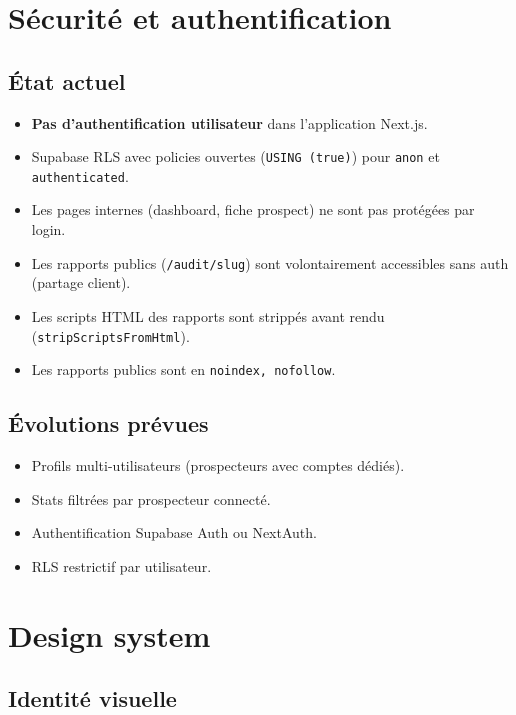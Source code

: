 \documentclass[11pt,a4paper]{report}
\begin{document}
\chapter{Sécurité et authentification}

\section{État actuel}

\begin{itemize}[leftmargin=*]
  \item \textbf{Pas d'authentification utilisateur} dans l'application Next.js.
  \item Supabase RLS avec policies ouvertes (\texttt{USING (true)}) pour \texttt{anon} et \texttt{authenticated}.
  \item Les pages internes (dashboard, fiche prospect) ne sont pas protégées par login.
  \item Les rapports publics (\texttt{/audit/slug}) sont volontairement accessibles sans auth (partage client).
  \item Les scripts HTML des rapports sont strippés avant rendu (\texttt{stripScriptsFromHtml}).
  \item Les rapports publics sont en \texttt{noindex, nofollow}.
\end{itemize}

\section{Évolutions prévues}

\begin{itemize}[leftmargin=*]
  \item Profils multi-utilisateurs (prospecteurs avec comptes dédiés).
  \item Stats filtrées par prospecteur connecté.
  \item Authentification Supabase Auth ou NextAuth.
  \item RLS restrictif par utilisateur.
\end{itemize}

\chapter{Design system}

\section{Identité visuelle}
\end{document}
